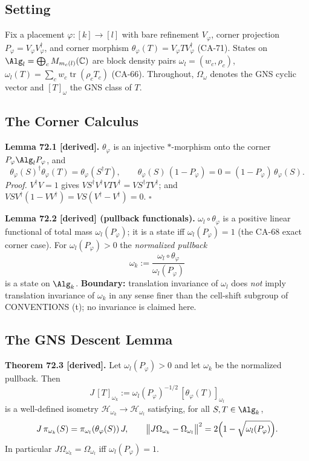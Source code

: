 \subsection{Setting}

Fix a placement \(\varphi:[k]\to[l]\) with bare refinement
\(V_\varphi\), corner projection \(P_\varphi=V_\varphi V_\varphi^\dagger\),
and corner morphism \(\theta_\varphi(T)=V_\varphi TV_\varphi^\dagger\)
(CA-71).  States on \(\Alg_l=\bigoplus_cM_{m_c(l)}(\mathbb C)\) are block
density pairs \(\omega_l=(w_c,\rho_c)\),
\(\omega_l(T)=\sum_cw_c\operatorname{tr}(\rho_cT_c)\) (CA-66).  Throughout,
\(\Omega_\omega\) denotes the GNS cyclic vector and \([T]_\omega\) the GNS
class of \(T\).

\subsection{The Corner Calculus}

\textbf{Lemma 72.1 [derived].}  \(\theta_\varphi\) is an injective
\(*\)-morphism onto the corner \(P_\varphi\Alg_lP_\varphi\), and
\[
  \theta_\varphi(S)^\dagger\theta_\varphi(T)=\theta_\varphi(S^\dagger T),
  \qquad
  \theta_\varphi(S)\,(1-P_\varphi)=0=(1-P_\varphi)\,\theta_\varphi(S).
\]
\emph{Proof.}  \(V^\dagger V=1\) gives
\(VS^\dagger V^\dagger VTV^\dagger=VS^\dagger TV^\dagger\); and
\(VSV^\dagger(1-VV^\dagger)=VS(V^\dagger-V^\dagger)=0\). \(\square\)

\textbf{Lemma 72.2 [derived] (pullback functionals).}
\(\omega_l\circ\theta_\varphi\) is a positive linear functional of total
mass \(\omega_l(P_\varphi)\); it is a state iff \(\omega_l(P_\varphi)=1\)
(the CA-68 exact corner case).  For \(\omega_l(P_\varphi)>0\) the
\emph{normalized pullback}
\[
  \omega_k:=\frac{\omega_l\circ\theta_\varphi}{\omega_l(P_\varphi)}
\]
is a state on \(\Alg_k\).  \textbf{Boundary:} translation invariance of
\(\omega_l\) does \emph{not} imply translation invariance of \(\omega_k\)
in any sense finer than the cell-shift subgroup of CONVENTIONS (t); no
invariance is claimed here.

\subsection{The GNS Descent Lemma}

\textbf{Theorem 72.3 [derived].}  Let \(\omega_l(P_\varphi)>0\) and let
\(\omega_k\) be the normalized pullback.  Then
\[
  J\,[T]_{\omega_k}:=\omega_l(P_\varphi)^{-1/2}\,
  [\theta_\varphi(T)]_{\omega_l}
\]
is a well-defined isometry \(\mathcal H_{\omega_k}\to\mathcal H_{\omega_l}\)
satisfying, for all \(S,T\in\Alg_k\),
\[
  J\,\pi_{\omega_k}(S)=\pi_{\omega_l}(\theta_\varphi(S))\,J,
  \qquad
  \bigl\|J\Omega_{\omega_k}-\Omega_{\omega_l}\bigr\|^2
  =2\Bigl(1-\sqrt{\omega_l(P_\varphi)}\Bigr).
\]
In particular \(J\Omega_{\omega_k}=\Omega_{\omega_l}\) iff
\(\omega_l(P_\varphi)=1\).

